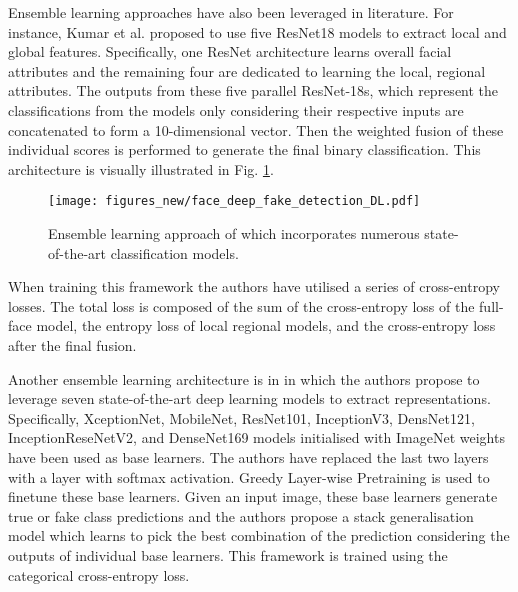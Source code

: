 Ensemble learning approaches have also been leveraged in literature. For instance, Kumar et al. \cite{kumar2020detecting} proposed to use five ResNet18 models to extract local and global features. Specifically, one ResNet architecture learns overall facial attributes and the remaining four
are dedicated to learning the local, regional attributes. The outputs from these five parallel ResNet-18s, which represent the classifications from the models only considering their respective inputs are concatenated to form a 10-dimensional vector. Then the weighted fusion of these individual scores is performed to generate the final binary classification. This architecture is visually illustrated in Fig. \ref{fig:ensemble_model}.

\begin{figure}[htbp]
    \centering
    \texttt{[image: figures\_new/face\_deep\_fake\_detection\_DL.pdf]}
    \caption{Ensemble learning approach of \cite{kumar2020detecting} which incorporates numerous state-of-the-art classification models.}
    \label{fig:ensemble_model}
\end{figure}

When training this framework the authors have utilised a series of cross-entropy losses. The total loss is composed of the sum of the cross-entropy loss of the full-face model, the entropy loss of local regional models, and the cross-entropy loss after the final fusion.  

Another ensemble learning architecture is in \cite{rana2020deepfakestack} in which the authors propose to leverage seven state-of-the-art deep learning models to extract representations. Specifically, XceptionNet, MobileNet, ResNet101, InceptionV3, DensNet121, InceptionReseNetV2, and DenseNet169 models initialised with ImageNet weights have been used as base learners. The authors have replaced the last two layers with a layer with softmax activation. Greedy Layer-wise Pretraining is used to finetune these base learners. Given an input image, these base learners generate true or fake class predictions and the authors propose a stack generalisation model which learns to pick the best combination of the prediction considering the outputs of individual base learners. This framework is trained using the categorical cross-entropy loss. 

